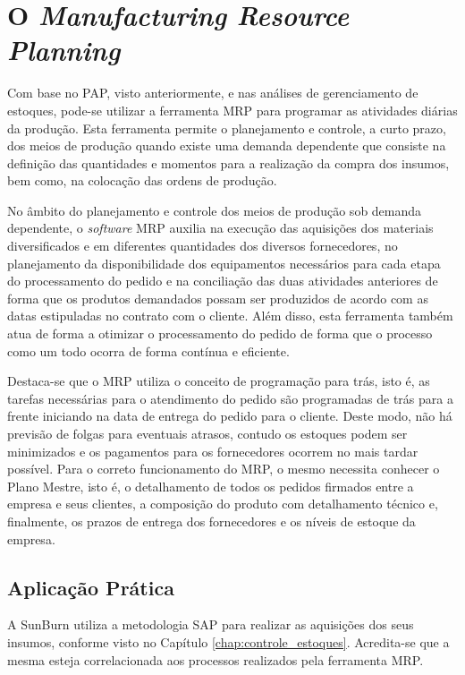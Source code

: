 \chapter{O \textit{Manufacturing Resource Planning}}
\label{chap:manufacturing_resource_planning}

Com base no \ac{PAP}, visto anteriormente, e nas análises de gerenciamento de estoques, pode-se utilizar a ferramenta \ac{MRP} para programar as atividades diárias da produção. Esta ferramenta permite o planejamento e controle, a curto prazo, dos meios de produção quando existe uma demanda dependente que consiste na definição das quantidades e momentos para a realização da compra dos insumos, bem como, na colocação das ordens de produção.

No âmbito do planejamento e controle dos meios de produção sob demanda dependente, o \textit{software} \ac{MRP} auxilia na execução das aquisições dos materiais diversificados e em diferentes quantidades dos diversos fornecedores, no planejamento da disponibilidade dos equipamentos necessários para cada etapa do processamento do pedido e na conciliação das duas atividades anteriores de forma que os produtos demandados possam ser produzidos de acordo com as datas estipuladas no contrato com o cliente. Além disso, esta ferramenta também atua de forma a otimizar o processamento do pedido de forma que o processo como um todo ocorra de forma contínua e eficiente.

Destaca-se que o \ac{MRP} utiliza o conceito de programação para trás, isto é, as tarefas necessárias para o atendimento do pedido são programadas de trás para a frente iniciando na data de entrega do pedido para o cliente. Deste modo, não há previsão de folgas para eventuais atrasos, contudo os estoques podem ser minimizados e os pagamentos para os fornecedores ocorrem no mais tardar possível. Para o correto funcionamento do \ac{MRP}, o mesmo necessita conhecer o Plano Mestre, isto é, o detalhamento de todos os pedidos firmados entre a empresa e seus clientes, a composição do produto com detalhamento técnico e, finalmente, os prazos de entrega dos fornecedores e os níveis de estoque da empresa.


\section{Aplicação Prática}
\label{sec:manufacturing_resource_planning_aplicacao}
A SunBurn utiliza a metodologia \ac{SAP} para realizar as aquisições dos seus insumos, conforme visto no Capítulo \ref{chap:controle_estoques}. Acredita-se que a mesma esteja correlacionada aos processos realizados pela ferramenta \ac{MRP}.
